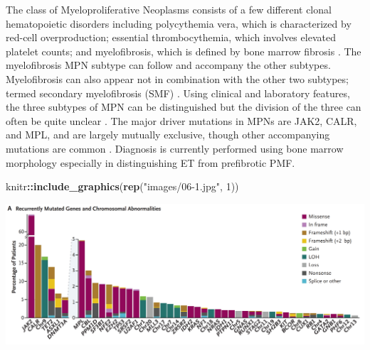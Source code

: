 \documentclass[]{book}
\newenvironment{Shaded}{\begin{snugshade}}{\end{snugshade}}
\newcommand{\KeywordTok}[1]{\textcolor[rgb]{0.13,0.29,0.53}{\textbf{#1}}}
\newcommand{\DataTypeTok}[1]{\textcolor[rgb]{0.13,0.29,0.53}{#1}}
\newcommand{\DecValTok}[1]{\textcolor[rgb]{0.00,0.00,0.81}{#1}}
\newcommand{\StringTok}[1]{\textcolor[rgb]{0.31,0.60,0.02}{#1}}
\newcommand{\OtherTok}[1]{\textcolor[rgb]{0.56,0.35,0.01}{#1}}
\newcommand{\OperatorTok}[1]{\textcolor[rgb]{0.81,0.36,0.00}{\textbf{#1}}}
\newcommand{\NormalTok}[1]{#1}
\begin{document}
The class of Myeloproliferative Neoplasms consists of a few different
clonal hematopoietic disorders including polycythemia vera, which is
characterized by red-cell overproduction; essential thrombocythemia,
which involves elevated platelet counts; and myelofibrosis, which is
defined by bone marrow fibrosis \citep{grinfeld2018classification}. The
myelofibrosis MPN subtype can follow and accompany the other subtypes.
Myelofibrosis can also appear not in combination with the other two
subtypes; termed secondary myelofibrosis (SMF)
\citep{mesa2012epidemiology}. Using clinical and laboratory features,
the three subtypes of MPN can be distinguished but the division of the
three can often be quite unclear
\citep{wilkins2008bone, tefferi2014overview}. The major driver mutations
in MPNs are JAK2, CALR, and MPL, and are largely mutually exclusive,
though other accompanying mutations are common
\citep{tefferi2015myeloproliferative}. Diagnosis is currently performed
using bone marrow morphology especially in distinguishing ET from
prefibrotic PMF.

\begin{Shaded}
\begin{Highlighting}[]
\NormalTok{knitr}\OperatorTok{::}\KeywordTok{include_graphics}\NormalTok{(}\KeywordTok{rep}\NormalTok{(}\StringTok{"images/06-1.jpg"}\NormalTok{, }\DecValTok{1}\NormalTok{))          }
\end{Highlighting}
\end{Shaded}

\includegraphics{images/06-1.jpg}

\begin{Shaded}
\end{Shaded}
\end{document}
